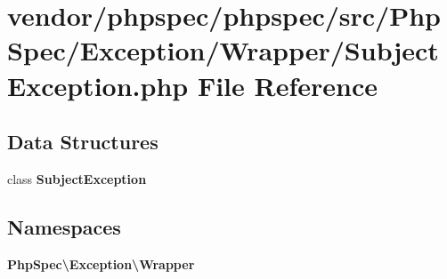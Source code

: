 \section{vendor/phpspec/phpspec/src/\+Php\+Spec/\+Exception/\+Wrapper/\+Subject\+Exception.php File Reference}
\label{_subject_exception_8php}
\subsection*{Data Structures}
\begin{DoxyCompactItemize}
\item 
class {\bf Subject\+Exception}
\end{DoxyCompactItemize}
\subsection*{Namespaces}
\begin{DoxyCompactItemize}
\item 
 {\bf Php\+Spec\textbackslash{}\+Exception\textbackslash{}\+Wrapper}
\end{DoxyCompactItemize}
